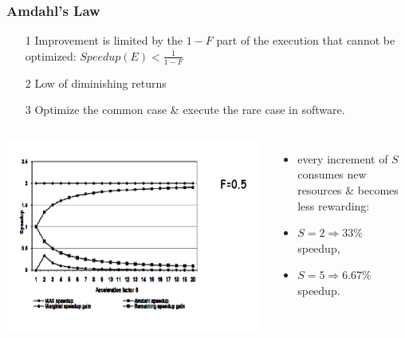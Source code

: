 \documentclass{beamer}
\begin{document}
\begin{frame}[fragile,t]
\frametitle{Amdahl's Law}

\begin{itemize}
    \item[1] Improvement is limited by the $1-F$ part of the execution 
                that cannot be optimized:
                $Speedup(E) < \frac{1}{1-F}$\medskip

    \item[2] Low of diminishing returns\smallskip

    \item[3] Optimize the common case \& execute the rare case in software.
\end{itemize}

\vspace{-4ex}
\begin{columns}
\includegraphics[width=55ex]{Ch1Figs/AmdhalDimRet}
\vspace{-3ex}
\begin{itemize}
    \item every increment of $S$ consumes new resources \& becomes less rewarding: 
    \item $S = 2 \Rightarrow 33\%$ speedup,
    \item $S = 5 \Rightarrow 6.67\%$ speedup.
\end{itemize}
\end{columns}

\end{frame}
\end{document}
